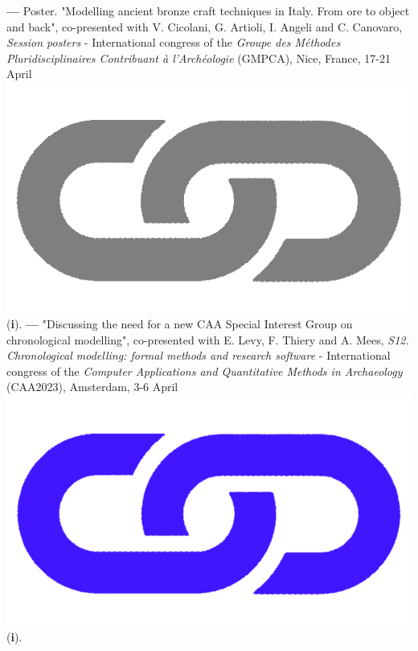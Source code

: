 \documentclass{article}
\begin{document}
\smallbreak
\textbf{--- }Poster. "Modelling ancient bronze craft techniques in Italy. From ore to object and back", co-presented with V. Cicolani, G. Artioli, I. Angeli and C. Canovaro, \textit{Session posters} - International congress of the \textit{Groupe des Méthodes Pluridisciplinaires Contribuant à l'Archéologie} (GMPCA), Nice, France, 17-21 April \href{https://gmpca2023.sciencesconf.org/}{\includegraphics[scale=0.02]{link_grey.png}} (\textbf{i}).
\smallbreak
\textbf{--- }"Discussing the need for a new CAA Special Interest Group on chronological modelling", co-presented with E. Levy, F. Thiery and A. Mees, \textit{S12. Chronological modelling: formal methods and research software} - International congress of the \textit{Computer Applications and Quantitative Methods in Archaeology} (CAA2023), Amsterdam, 3-6 April \href{https://historical-time.github.io/caa23/sig/pres}{\includegraphics[scale=0.02]{link_darkblue.png}} (\textbf{i}).
\smallbreak
\end{document}
